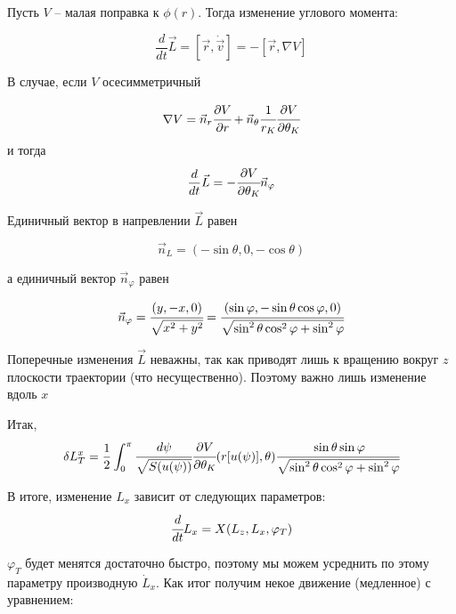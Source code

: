 \documentclass[a4paper, 14pt]{article}
\begin{document}
Пусть $V$ – малая поправка к $\phi(r)$. Тогда изменение углового момента:

\begin{equation*}
\frac{d}{dt} \vec{L} = [\vec{r},\dot{\vec{v}}] = -[\vec{r},\nabla V]
\end{equation*}

В случае, если $V$ осесимметричный

\begin{equation*}
\nabla V = \vec{n}_r \cfrac{\partial V}{\partial r} + \vec{n}_{\theta} \cfrac{1}{r_K}
\cfrac{\partial V}{\partial \theta_K}
\end{equation*}
и тогда
\begin{equation*}
\frac{d}{dt} \vec{L} = -\cfrac{\partial V}{\partial \theta_K} \vec{n}_{\varphi}
\end{equation*}

Единичный вектор в напревлении $\vec{L}$ равен

\begin{equation*}
\vec{n}_{L} = (-\sin{\theta},0,-\cos{\theta})
\end{equation*}

а единичный вектор $\vec{n}_{\varphi}$ равен

\begin{equation*}
\vec{n}_{\varphi} = \cfrac{(y,-x,0)}{\sqrt{x^2+y^2}} = \cfrac{(\sin{\varphi},-\sin{\theta} \cos{\varphi},0)}{\sqrt{\sin^2{\theta} \cos^2{\varphi}+\sin^2{\varphi}}}
\end{equation*}

Поперечные изменения $\vec{L}$ неважны, так как приводят лишь к вращению вокруг $z$
плоскости траектории (что несущественно). Поэтому важно лишь изменение вдоль $x$

Итак, 
\begin{equation*}
\delta L^{x}_{T} = \frac{1}{2}\int_{0}^{\pi} {\cfrac{d\psi}{\sqrt{S(u(\psi))}}}
\cfrac{\partial V}{\partial \theta_K}(r[u(\psi)], \theta)
\cfrac{\sin{\theta} \sin{\varphi}}{\sqrt{\sin^2{\theta} \cos^2{\varphi}+\sin^2{\varphi}}}
\end{equation*}

В итоге, изменение $L_x$ зависит от следующих параметров: 
\begin{equation*}
\cfrac{d}{dt}L_x = X(L_z,L_x,\varphi_T)
\end{equation*}

$\varphi_T$ будет менятся достаточно быстро, поэтому мы можем
усреднить по этому параметру производную $\dot{L}_x$. Как итог получим некое движение (медленное) с уравнением:
\end{document}
